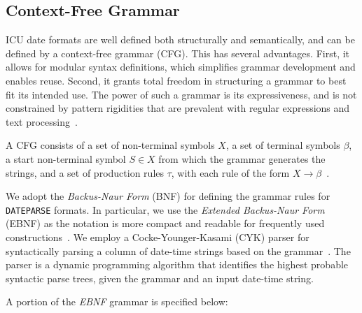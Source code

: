 
\subsection{Context-Free Grammar}
ICU date formats are well defined both structurally and semantically, and can be defined by a context-free grammar (CFG). This has several advantages. First, it allows for modular syntax definitions, which simplifies grammar development and enables reuse. Second, it grants total freedom in structuring a grammar to best fit its intended use. The power of such a grammar is its expressiveness, and is not constrained by pattern rigidities that are prevalent with regular expressions and text processing~\cite{Grune:1990}.


A CFG consists of a set of non-terminal symbols $X$, a set of terminal symbols $\beta$, a start non-terminal symbol $S \in X$ from which the grammar generates the strings, and a set of production rules $\tau$, with each rule of the form $X \rightarrow \beta$~\cite{Hopcroft:1990}. 

We adopt the \textit{Backus-Naur Form} (BNF) for defining the grammar rules for \texttt{DATEPARSE} formats. In particular, we use the \textit{Extended Backus-Naur Form} (EBNF) as the notation is more compact and readable for frequently used constructions~\cite{Grune:1990}. We employ a Cocke-Younger-Kasami (CYK) parser for syntactically parsing a column of date-time strings based on the grammar~\cite{Cocke:1969,Younger67,Kasami:1965}. The parser is a dynamic programming algorithm that identifies the highest probable syntactic parse trees, given the grammar and an input date-time string.


A portion of the \textit{EBNF} grammar is specified below:

